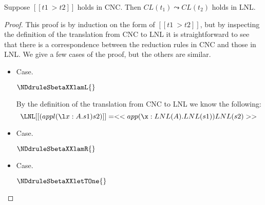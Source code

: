 \begin{lemma}
  Suppose $[[t1 ~> t2]]$ holds in CNC. Then $CL(t_1)\leadsto CL(t_2)$ holds
  in LNL.
\end{lemma}
\begin{proof}
  This proof is by induction on the form of $[[t1 ~> t2]]$, but by
  inspecting the definition of the translation from CNC to LNL it is
  straightforward to see that there is a correspondence between the
  reduction rules in CNC and those in LNL.  We give a few cases of the
  proof, but the others are similar.

  \begin{itemize}
  \item[] Case.
    \begin{center}
      $\NDdruleSbetaXXlamL{}$
    \end{center}
    By the definition of the translation from CNC to LNL we know the following:
    \[
      \LNL[[(appl (\l x:A.s1) s2)]] = <<app (\x:LNL(A).LNL(s1)) LNL(s2)>>\\
    \]

  \item[] Case.
    \begin{center}
      $\NDdruleSbetaXXlamR{}$
    \end{center}
    
  \item[] Case.
    \begin{center}
      $\NDdruleSbetaXXletTOne{}$
    \end{center}

    
  \end{itemize}
\end{proof}



















